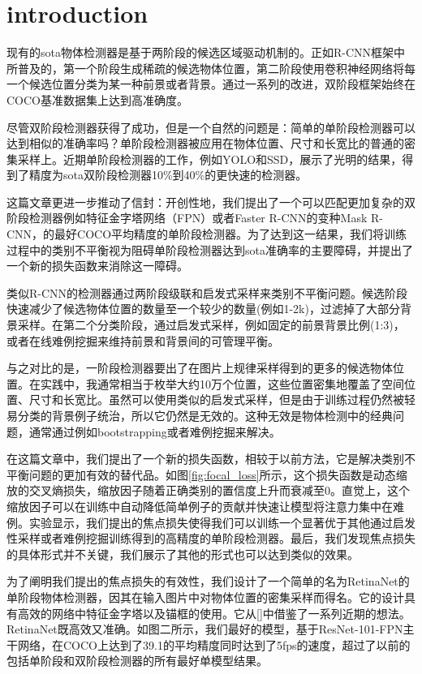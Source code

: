 \documentclass{ctexart}
\begin{document}
\section{introduction}
现有的sota物体检测器是基于两阶段的候选区域驱动机制的。正如R-CNN\cite{r_cnn}框架中所普及的，第一个阶段生成稀疏的候选物体位置，第二阶段使用卷积神经网络将每一个候选位置分类为某一种前景或者背景。通过一系列的改进，双阶段框架始终在COCO基准数据集\cite{coco}上达到高准确度。\par
尽管双阶段检测器获得了成功，但是一个自然的问题是：简单的单阶段检测器可以达到相似的准确率吗？单阶段检测器被应用在物体位置、尺寸和长宽比的普通的密集采样上。近期单阶段检测器的工作，例如YOLO\cite{yolo, yolov2}和SSD\cite{ssd}，展示了光明的结果，得到了精度为sota双阶段检测器10\%到40\%的更快速的检测器。\par
这篇文章更进一步推动了信封：开创性地，我们提出了一个可以匹配更加复杂的双阶段检测器例如特征金字塔网络（FPN）\cite{fpn}或者Faster R-CNN\cite{faster_r_cnn}的变种Mask R-CNN\cite{mask_r_cnn}，的最好COCO平均精度的单阶段检测器。为了达到这一结果，我们将训练过程中的类别不平衡视为阻碍单阶段检测器达到sota准确率的主要障碍，并提出了一个新的损失函数来消除这一障碍。\par
类似R-CNN的检测器通过两阶段级联和启发式采样来类别不平衡问题。候选阶段快速减少了候选物体位置的数量至一个较少的数量(例如1-2k)，过滤掉了大部分背景采样。在第二个分类阶段，通过启发式采样，例如固定的前景背景比例(1:3)，或者在线难例挖掘来维持前景和背景间的可管理平衡。\par
与之对比的是，一阶段检测器要出了在图片上规律采样得到的更多的候选物体位置。在实践中，我通常相当于枚举大约10万个位置，这些位置密集地覆盖了空间位置、尺寸和长宽比。虽然可以使用类似的启发式采样，但是由于训练过程仍然被轻易分类的背景例子统治，所以它仍然是无效的。这种无效是物体检测中的经典问题，通常通过例如bootstrapping或者难例挖掘来解决。\par
在这篇文章中，我们提出了一个新的损失函数，相较于以前方法，它是解决类别不平衡问题的更加有效的替代品。如图\ref{fig:focal_loss}所示，这个损失函数是动态缩放的交叉熵损失，缩放因子随着正确类别的置信度上升而衰减至0。直觉上，这个缩放因子可以在训练中自动降低简单例子的贡献并快速让模型将注意力集中在难例。实验显示，我们提出的焦点损失使得我们可以训练一个显著优于其他通过启发性采样或者难例挖掘训练得到的高精度的单阶段检测器。最后，我们发现焦点损失的具体形式并不关键，我们展示了其他的形式也可以达到类似的效果。\par
为了阐明我们提出的焦点损失的有效性，我们设计了一个简单的名为RetinaNet的单阶段物体检测器，因其在输入图片中对物体位置的密集采样而得名。它的设计具有高效的网络中特征金字塔以及锚框的使用。它从[]中借鉴了一系列近期的想法。RetinaNet既高效又准确。如图二所示，我们最好的模型，基于ResNet-101-FPN主干网络，在COCO上达到了39.1的平均精度同时达到了5fps的速度，超过了以前的包括单阶段和双阶段检测器的所有最好单模型结果。
\end{document}
